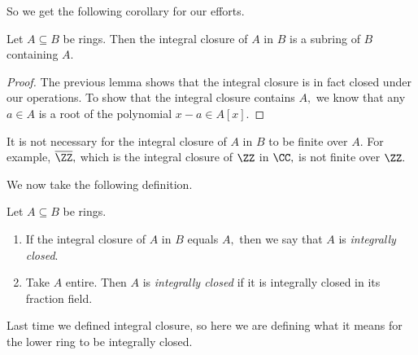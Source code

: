 \documentclass[../notes.tex]{subfiles}
\begin{document}
So we get the following corollary for our efforts.
\begin{thm}
    Let $A\subseteq B$ be rings. Then the integral closure of $A$ in $B$ is a subring of $B$ containing $A.$
\end{thm}
\begin{proof}
    The previous lemma shows that the integral closure is in fact closed under our operations. To show that the integral closure contains $A,$ we know that any $a\in A$ is a root of the polynomial $x-a\in A[x].$
\end{proof}
\begin{remark}
    It is not necessary for the integral closure of $A$ in $B$ to be finite over $A.$ For example, $\overline\ZZ,$ which is the integral closure of $\ZZ$ in $\CC,$ is not finite over $\ZZ.$
\end{remark}

We now take the following definition.
\begin{defi}
    Let $A\subseteq B$ be rings.
    \begin{enumerate}[label=(\alph*)]
        \item If the integral closure of $A$ in $B$ equals $A,$ then we say that $A$ is \textit{integrally closed}.
        \item Take $A$ entire. Then $A$ is \textit{integrally closed} if it is integrally closed in its fraction field.
    \end{enumerate}
\end{defi}
Last time we defined integral closure, so here we are defining what it means for the lower ring to be integrally closed.
\end{document}
